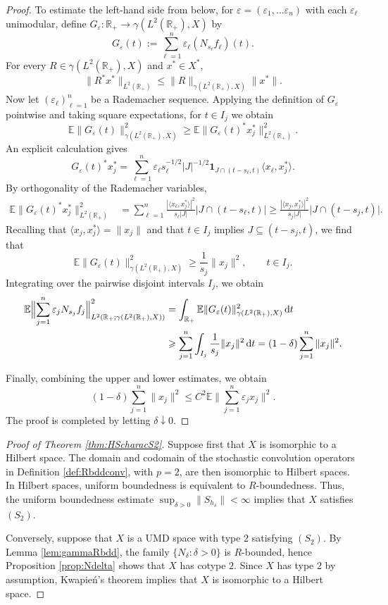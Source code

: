 \documentclass{amsart}
\let\leq\leqslant
\let\geq\geqslant
\theoremstyle{plain}
\theoremstyle{remark}
\theoremstyle{plain}
\numberwithin{equation}{section}
\newcommand{\R}{\mathbb R}
\newcommand{\E}{\mathbb E}
\newcommand{\1}{\mathbf 1}
\newcommand{\dd}{\,{\rm d}}
\begin{document}
\begin{proof}
To estimate the left-hand side from below, for $\varepsilon = (\varepsilon_1,\dots \varepsilon_n)$ with each $\varepsilon_\ell$ unimodular, define $G_\varepsilon:\R_+\to \gamma(L^2(\R_+),X)$ by
\[
G_{\varepsilon}(t):=\sum_{\ell=1}^n \varepsilon_\ell(N_{s_\ell}f_\ell)(t).
\]
For every $R\in\gamma(L^2(\R_+),X)$ and $x^*\in X^*$,
\[
\|R^*x^*\|_{L^2(\R_+)}
\leq
\|R\|_{\gamma(L^2(\R_+),X)}\|x^*\|.
\]
Now let $(\varepsilon_\ell)_{\ell=1}^n$ be a Rademacher sequence. Applying the definition of $G_\varepsilon$ pointwise and taking square expectations, for $t\in I_j$ we obtain
\[
\E\|G_{\varepsilon}(t)\|_{\gamma(L^2(\R_+),X)}^2
\geq
\E\|G_{\varepsilon}(t)^*x_j^*\|_{L^2(\R_+)}^2.
\]
An explicit calculation gives
\[
G_{\varepsilon}(t)^*x_j^*
=
\sum_{\ell=1}^n
\varepsilon_\ell s_\ell^{-1/2} |J|^{-1/2}
\1_{J\cap(t-s_\ell,t)}
\langle x_\ell,x_j^*\rangle.
\]
By orthogonality of the Rademacher variables,
\begin{align*}
\E\|G_{\varepsilon}(t)^*x_j^*\|_{L^2(\R_+)}^2
&=
\sum_{\ell=1}^n
\frac{|\langle x_\ell,x_j^*\rangle|^2}{s_\ell |J|}
\bigl|J\cap(t-s_\ell,t)\bigr|\geq
\frac{|\langle x_j,x_j^*\rangle|^2}{s_j |J|}
\bigl|J\cap(t-s_j,t)\bigr|.
\end{align*}
Recalling that $\langle x_j,x_j^*\rangle=\|x_j\|$ and that $t\in I_j$ implies $J\subseteq(t-s_j,t)$, we find that
\[
\E\|G_{\varepsilon}(t)\|_{\gamma(L^2(\R_+),X)}^2
\geq
\frac{1}{s_j}\|x_j\|^2,
\qquad t\in I_j.
\]
Integrating over the pairwise disjoint intervals $I_j$, we obtain
\begin{align*}
\E
\Bigl\|
\sum_{j=1}^n \varepsilon_jN_{s_j}f_j
\Bigr\|_{L^2(\R_+;\gamma(L^2(\R_+),X))}^2
 &=
\int_{\R_+}\E\|G_{\varepsilon}(t)\|_{\gamma(L^2(\R_+),X)}^2\dd t
\\ & \geq
\sum_{j=1}^n
\int_{I_j}
\frac{1}{s_j}\|x_j\|^2\dd t
=
(1-\delta)
\sum_{j=1}^n\|x_j\|^2.
\end{align*}

Finally, combining the upper and lower estimates, we obtain
\[
        (1-\delta)\sum_{j=1}^n\|x_j\|^2
        \leq
        C^2\E\Big\|\sum_{j=1}^n\varepsilon_jx_j\Big\|^2.
\]
The proof is completed by letting $\delta\downarrow0$.
\end{proof}



\begin{proof}[Proof of Theorem \ref{thm:HScharacS2}]
Suppose first that $X$ is isomorphic to a Hilbert space. The domain and codomain of the stochastic convolution operators in Definition \ref{def:Rbddconv}, with $p=2$, are then isomorphic to Hilbert spaces. In Hilbert spaces, uniform boundedness is equivalent to $R$-boundedness. Thus, the uniform boundedness estimate \(\sup_{\delta>0}\|S_{h_\delta}\|<\infty\) implies that $X$ satisfies $(S_2)$.

Conversely, suppose that $X$ is a UMD space with type $2$ satisfying $(S_2)$. By Lemma \ref{lem:gammaRbdd}, the family \(\{N_\delta:\delta>0\}\) is $R$-bounded, hence Proposition \ref{prop:Ndelta} shows that $X$ has cotype $2$. Since $X$ has type $2$ by assumption, Kwapie\'n's theorem implies that $X$ is isomorphic to a Hilbert space.
\end{proof}
\end{document}
